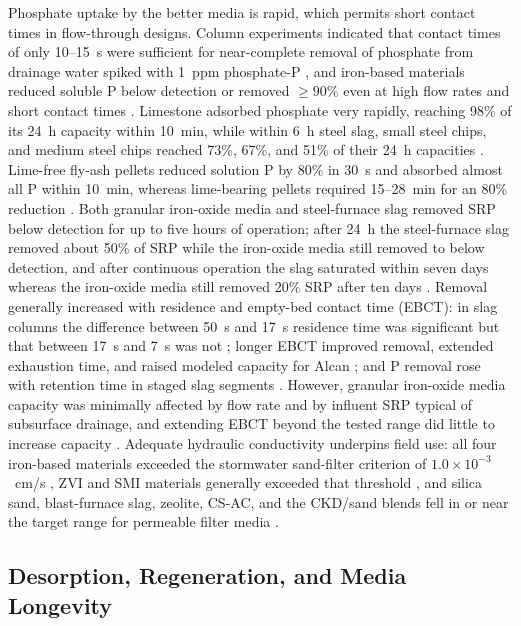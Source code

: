\documentclass[11pt]{article}
\begin{document}
Phosphate uptake by the better media is rapid, which permits short contact times
in flow-through designs. Column experiments indicated that contact times of only
10--15~s were sufficient for near-complete removal of phosphate from drainage
water spiked with 1~ppm phosphate-P \parencite{Allred2017}, and iron-based
materials reduced soluble P below detection or removed $\geq 90\%$ even at high
flow rates and short contact times \parencite{Allred2014}. Limestone adsorbed
phosphate very rapidly, reaching 98\% of its 24~h capacity within 10~min, while
within 6~h steel slag, small steel chips, and medium steel chips reached 73\%,
67\%, and 51\% of their 24~h capacities \parencite{Sellner2019b}. Lime-free
fly-ash pellets reduced solution P by 80\% in 30~s and absorbed almost all P
within 10~min, whereas lime-bearing pellets required 15--28~min for an 80\%
reduction \parencite{Li2017}. Both granular iron-oxide media and steel-furnace
slag removed SRP below detection for up to five hours of operation; after 24~h the
steel-furnace slag removed about 50\% of SRP while the iron-oxide media still
removed to below detection, and after continuous operation the slag saturated
within seven days whereas the iron-oxide media still removed 20\% SRP after ten
days \parencite{Hauda2020}. Removal generally increased with residence and
empty-bed contact time (EBCT): in slag columns the difference between 50~s and
17~s residence time was significant but that between 17~s and 7~s was not
\parencite{Sanford2016}; longer EBCT improved removal, extended exhaustion time,
and raised modeled capacity for Alcan \parencite{Kumari2025}; and P removal rose
with retention time in staged slag segments \parencite{Wang2020d}. However,
granular iron-oxide media capacity was minimally affected by flow rate and by
influent SRP typical of subsurface drainage, and extending EBCT beyond the tested
range did little to increase capacity \parencite{Hauda2020}. Adequate hydraulic
conductivity underpins field use: all four iron-based materials exceeded the
stormwater sand-filter criterion of $1.0\times10^{-3}$~cm/s
\parencite{Allred2014}, ZVI and SMI materials generally exceeded that threshold
\parencite{Allred2012}, and silica sand, blast-furnace slag, zeolite, CS-AC, and
the CKD/sand blends fell in or near the target range for permeable filter media
\parencite{Agrawal2011}.

\subsection{Desorption, Regeneration, and Media Longevity}
\end{document}
